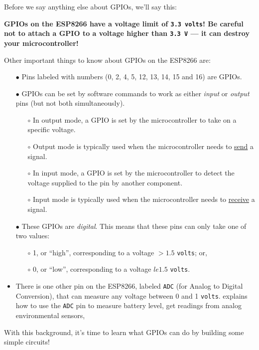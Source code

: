 Before we say anything else about GPIOs, we'll say this:

\color{red} \textbf{GPIOs on the ESP8266 have a voltage limit of \texttt{3.3 volts}! Be careful not to attach a GPIO to a voltage higher than \texttt{3.3 V} --- it can destroy your microcontroller!} \color{black}

Other important things to know about GPIOs on the ESP8266 are:
\begin{itemize}
	\item[$\bullet$] Pins labeled with numbers (0, 2, 4, 5, 12, 13, 14, 15 and 16) are GPIOs.
	\item[$\bullet$] GPIOs can be set by software commands to work as either \emph{input} or \emph{output} pins (but not both simultaneously).
	 \begin{itemize}
		\item[$\circ$] In output mode, a GPIO is set by the microcontroller to take on a specific voltage.
		\item[$\circ$] Output mode is typically used when the microcontroller needs to \underline{send} a signal.
		\item[$\circ$] In input mode, a GPIO is set by the microcontroller to detect the voltage supplied to the pin by another component.
		\item[$\circ$] Input mode is typically used when the microcontroller needs to \underline{receive} a signal.
	\end{itemize}
	\item[$\bullet$] These GPIOs are \emph{digital}. This means that these pins can only take one of two values:
	 \begin{itemize}
	 	\item[$\circ$] 1, or ``high'', corresponding to a voltage $> 1.5$ \texttt{volts}; or,
	 	\item[$\circ$] 0, or ``low'', corresponding to a voltage $le 1.5$ \texttt{volts}.
	\end{itemize}
	\item There is one other pin on the ESP8266, labeled \texttt{ADC} (for Analog to Digital Conversion), that can measure any voltage between 0  and 1 \texttt{volts}.  explains how to use the \texttt{ADC} pin to measure battery level, get readings from analog environmental sensors, \etc
\end{itemize}
With this background, it's time to learn what GPIOs can do by building some simple circuits!

